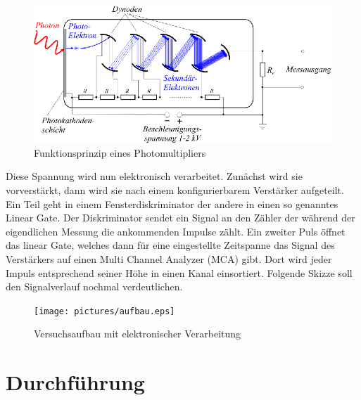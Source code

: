 \documentclass[12pt]{article}
\begin{document}
\begin{figure}[H]
 \includegraphics[width=0.9\linewidth]{pictures/photomultiplier_schema.eps}
 \caption{Funktionsprinzip eines Photomultipliers}
\end{figure}

Diese Spannung wird nun elektronisch verarbeitet. Zunächst wird sie vorverstärkt, dann wird sie nach einem konfigurierbarem Verstärker aufgeteilt. Ein Teil geht in einem Fensterdiskriminator der andere in einen so genanntes Linear Gate. Der Diskriminator sendet ein Signal an den Zähler der während der eigendlichen Messung die ankommenden Impulse zählt. Ein zweiter Puls öffnet das linear Gate, welches dann für eine eingestellte Zeitspanne das Signal des Verstärkers auf einen Multi Channel Analyzer (MCA) gibt. Dort wird jeder Impuls entsprechend seiner Höhe in einen Kanal einsortiert. Folgende Skizze soll 
den Signalverlauf nochmal verdeutlichen.
\begin{figure}[H]
 \texttt{[image: pictures/aufbau.eps]}
 \caption{Versuchsaufbau mit elektronischer Verarbeitung}
\end{figure}
\section{Durchführung}
\end{document}
